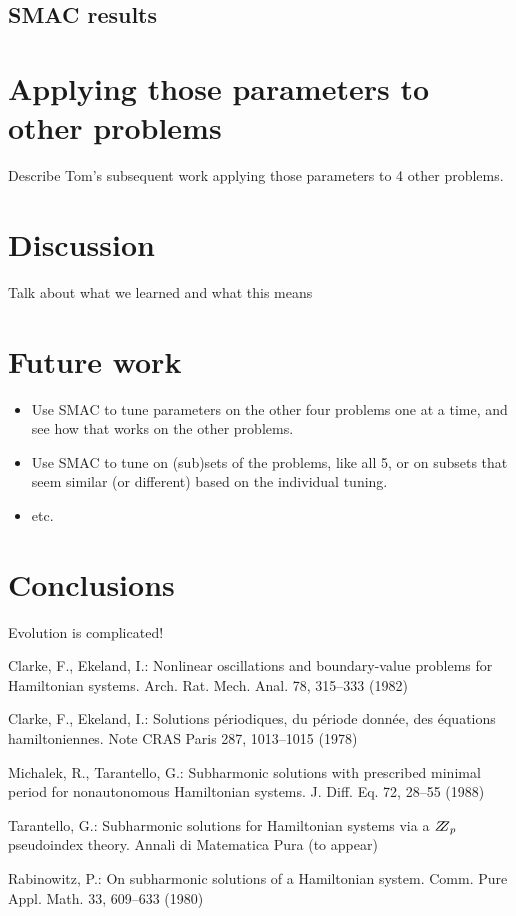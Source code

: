 \documentclass{llncs}
\begin{document}
\subsection{SMAC results}
\label{sec:SMACresultsRSWN}

\section{Applying those parameters to other problems}
\label{sec:applyingToOtherProblems}

Describe Tom's subsequent work applying those parameters to 4 other
problems.

\section{Discussion}
\label{sec:discussion}

Talk about what we learned and what this means

\section{Future work}
\label{sec:futureWork}

\begin{itemize}
	\item Use SMAC to tune parameters on the other four problems one at a time, and see how that works on the other problems.
	\item Use SMAC to tune on (sub)sets of the problems, like all 5, or on subsets that seem similar (or different) based on the individual tuning.
	\item etc.
\end{itemize}

\section{Conclusions}
\label{sec:conclusion}

Evolution is complicated!

%
%
\begin{thebibliography}{5}
%
Clarke, F., Ekeland, I.:
Nonlinear oscillations and
boundary-value problems for Hamiltonian systems.
Arch. Rat. Mech. Anal. 78, 315--333 (1982)

Clarke, F., Ekeland, I.:
Solutions p\'{e}riodiques, du
p\'{e}riode donn\'{e}e, des \'{e}quations hamiltoniennes.
Note CRAS Paris 287, 1013--1015 (1978)

Michalek, R., Tarantello, G.:
Subharmonic solutions with prescribed minimal
period for nonautonomous Hamiltonian systems.
J. Diff. Eq. 72, 28--55 (1988)

Tarantello, G.:
Subharmonic solutions for Hamiltonian
systems via a $\bbbz_{p}$ pseudoindex theory.
Annali di Matematica Pura (to appear)

Rabinowitz, P.:
On subharmonic solutions of a Hamiltonian system.
Comm. Pure Appl. Math. 33, 609--633 (1980)

\end{thebibliography}

\clearpage
{} %
\renewcommand{\indexname}{Author Index}
\printindex
\clearpage
{} %
\renewcommand{\indexname}{Subject Index}

\end{document}
